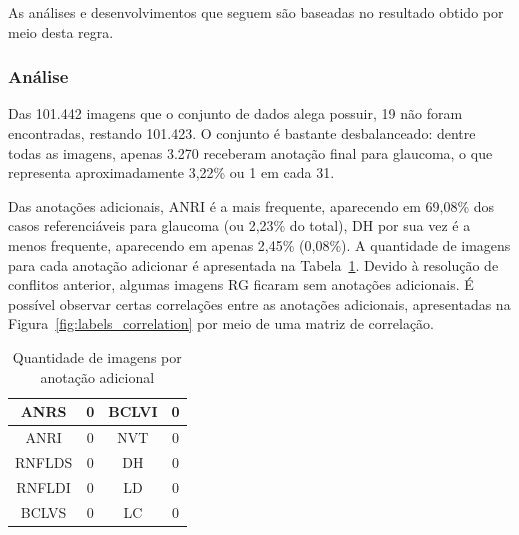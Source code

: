 \documentclass[12pt]{article}
\begin{document}

As análises e desenvolvimentos que seguem são baseadas no resultado obtido por meio desta regra.

\subsubsection{Análise}
\label{sec:dataset:analysis}
Das 101.442 imagens que o conjunto de dados alega possuir, 19 não foram encontradas, restando 101.423. O conjunto é bastante desbalanceado: dentre todas as imagens, apenas 3.270 receberam anotação final para glaucoma, o que representa aproximadamente 3,22\% ou 1 em cada 31.

Das anotações adicionais, ANRI é a mais frequente, aparecendo em 69,08\% dos casos referenciáveis para glaucoma (ou 2,23\% do total), DH por sua vez é a menos frequente, aparecendo em apenas 2,45\% (0,08\%). A quantidade de imagens para cada anotação adicionar é apresentada na Tabela~\ref{tab:features_count}. Devido à resolução de conflitos anterior, algumas imagens RG ficaram sem anotações adicionais. %
É possível observar certas correlações entre as anotações adicionais, apresentadas na Figura~\ref{fig:labels_correlation} por meio de uma matriz de correlação.

\begin{table}[htb]
    \centering
    \begin{tabular}{|c|c||c|c|}
    \hline
    ANRS & 0 & BCLVI & 0 \\
    \hline
    ANRI & 0 & NVT & 0 \\
    \hline
    RNFLDS & 0 & DH & 0 \\
    \hline
    RNFLDI & 0 & LD & 0 \\
    \hline
    BCLVS & 0 & LC & 0 \\
    \hline
    \end{tabular}
    \caption{Quantidade de imagens por anotação adicional}
    \label{tab:features_count}
\end{table}
\end{document}
